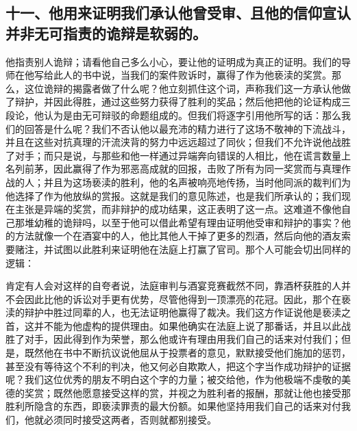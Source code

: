 
\subsection{十一、他用来证明我们承认他曾受审、且他的信仰宣认并非无可指责的诡辩是软弱的。}

他指责别人诡辩；请看他自己多么小心，要让他的证明成为真正的证明。我们的导师在他写给此人的书中说，当我们的案件败诉时，赢得了作为他亵渎的奖赏。那么，这位诡辩的揭露者做了什么呢？他立刻抓住这个词，声称我们这一方承认他做了辩护，并因此得胜，通过这些努力获得了胜利的奖品；然后他把他的论证构成三段论，他认为是由无可辩驳的命题组成的。但我们将逐字引用他所写的话：那么我们的回答是什么呢？我们不否认他以最充沛的精力进行了这场不敬神的下流战斗，并且在这些对抗真理的汗流浃背的努力中远远超过了同伙；但我们不允许说他战胜了对手；而只是说，与那些和他一样通过异端奔向错误的人相比，他在谎言数量上名列前茅，因此赢得了作为邪恶高成就的回报，击败了所有为同一奖赏而与真理作战的人；并且为这场亵渎的胜利，他的名声被响亮地传扬，当时他同派的裁判们为他选择了作为他放纵的赏报。这就是我们的意见陈述，也是我们所承认的；我们现在主张是异端的奖赏，而非辩护的成功结果，这正表明了这一点。这难道不像他自己那堆幼稚的诡辩吗，以至于他可以借此希望有理由证明他受审和辩护的事实？他的方法就像一个在酒宴中的人，他比其他人干掉了更多的烈酒，然后向他的酒友索要赌注，并试图以此胜利来证明他在法庭上打赢了官司。那个人可能会切出同样的逻辑：\par

肯定有人会对这样的自夸者说，法庭审判与酒宴竞赛截然不同，靠酒杯获胜的人并不会因此比他的诉讼对手更有优势，尽管他得到一顶漂亮的花冠。因此，那个在亵渎的辩护中胜过同辈的人，也无法证明他赢得了裁决。我们这方作证说他是亵渎之首，这并不能为他虚构的提供理由。如果他确实在法庭上说了那番话，并且以此战胜了对手，因此得到作为荣誉，那么他或许有理由用我们自己的话来对付我们；但是，既然他在书中不断抗议说他屈从于投票者的意见，默默接受他们施加的惩罚，甚至没有等待这个不利的判决，他又何必自欺欺人，把这个字当作成功辩护的证据呢？我们这位优秀的朋友不明白这个字的力量；被交给他，作为他极端不虔敬的美德的奖赏；既然他愿意接受这样的赏，并视之为胜利者的报酬，那就让他也接受那胜利所隐含的东西，即亵渎罪责的最大份额。如果他坚持用我们自己的话来对付我们，他就必须同时接受这两者，否则就都别接受。\par

